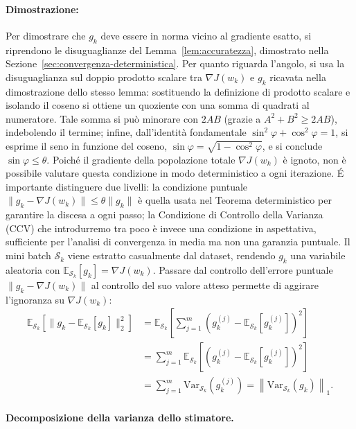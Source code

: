 \documentclass[a4paper,12pt]{article}
\numberwithin{equation}{section}
\numberwithin{figure}{section}
\numberwithin{table}{section}
\newcommand{\E}{\mathbb{E}}
\begin{document}
\paragraph{Dimostrazione:}\label{sec:cono-dimostrazione}
Per dimostrare che $g_k$ deve essere in norma vicino al gradiente esatto, si riprendono le disuguaglianze del Lemma~\ref{lem:accuratezza}, dimostrato nella Sezione~\ref{sec:convergenza-deterministica}. Per quanto riguarda l'angolo, si usa la disuguaglianza sul doppio prodotto scalare tra $\nabla J(w_k)$ e $g_k$ ricavata nella dimostrazione dello stesso lemma: sostituendo la definizione di prodotto scalare e isolando il coseno si ottiene un quoziente con una somma di quadrati al numeratore. Tale somma si può minorare con $2AB$ (grazie a $A^2+B^2 \ge 2AB$), indebolendo il termine; infine, dall'identità fondamentale $\sin^2\varphi+\cos^2\varphi=1$, si esprime il seno in funzione del coseno, $\sin\varphi=\sqrt{1-\cos^2\varphi}$, e si conclude $\sin\varphi \le \theta$. \newline
Poich\'e il gradiente della popolazione totale $\nabla J(w_k)$ \`e ignoto, non \`e possibile valutare questa condizione in modo deterministico a ogni iterazione. \'E importante distinguere due livelli: la condizione puntuale $\|g_k - \nabla J(w_k)\| \le \theta\|g_k\|$ \`e quella usata nel Teorema deterministico per garantire la discesa a ogni passo; la Condizione di Controllo della Varianza (CCV) che introdurremo tra poco \`e invece una condizione in aspettativa, sufficiente per l'analisi di convergenza in media ma non una garanzia puntuale. Il mini batch $\mathcal{S}_k$ viene estratto casualmente dal dataset, rendendo $g_k$ una variabile aleatoria con $\E_{\mathcal{S}_k}[g_k] = \nabla J(w_k)$. Passare dal controllo dell'errore puntuale $\|g_k - \nabla J(w_k)\|$ al controllo del suo valore atteso permette di aggirare l'ignoranza su $\nabla J(w_k)$:
\begin{align*}
\mathbb{E}_{\mathcal{S}_k}\left[\|g_k - \mathbb{E}_{\mathcal{S}_k}[g_k]\|_2^2\right]
&= \mathbb{E}_{\mathcal{S}_k}\left[\sum_{j=1}^{m} \left(g_k^{(j)} - \mathbb{E}_{\mathcal{S}_k}[g_k^{(j)}]\right)^2\right] \\
&= \sum_{j=1}^{m} \mathbb{E}_{\mathcal{S}_k}\left[\left(g_k^{(j)} - \mathbb{E}_{\mathcal{S}_k}[g_k^{(j)}]\right)^2\right] \\
&= \sum_{j=1}^{m} \mathrm{Var}_{\mathcal{S}_k}\left(g_k^{(j)}\right)
= \left\|\mathrm{Var}_{\mathcal{S}_k}(g_k)\right\|_1.
\end{align*}

\paragraph{Decomposizione della varianza dello stimatore.}
\end{document}
